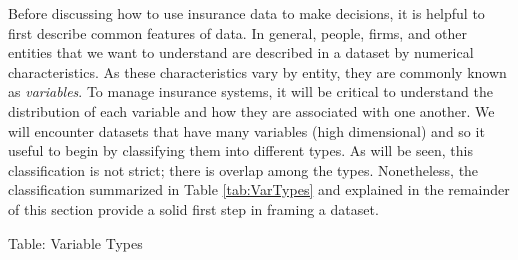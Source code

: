 \documentclass[]{book}
\theoremstyle{definition}
\theoremstyle{definition}
\theoremstyle{definition}
\theoremstyle{remark}
\begin{document}
Before discussing how to use insurance data to make decisions, it is
helpful to first describe common features of data. In general, people,
firms, and other entities that we want to understand are described in a
dataset by numerical characteristics. As these characteristics vary by
entity, they are commonly known as \emph{variables}. To manage insurance
systems, it will be critical to understand the distribution of each
variable and how they are associated with one another. We will encounter
datasets that have many variables (high dimensional) and so it useful to
begin by classifying them into different types. As will be seen, this
classification is not strict; there is overlap among the types.
Nonetheless, the classification summarized in Table \ref{tab:VarTypes}
and explained in the remainder of this section provide a solid first
step in framing a dataset.

Table: \label{tab:VarTypes} Variable Types
\end{document}

